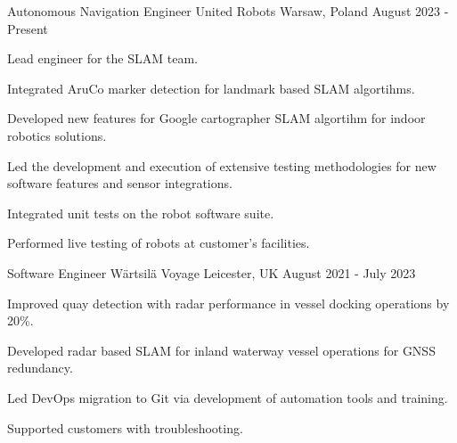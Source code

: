

\begin{cventries}

  \cventry
    {Autonomous Navigation Engineer} %
    {United Robots} %
    {Warsaw, Poland} %
    {August 2023 - Present} %
    {
      \begin{cvitems} %
        \item {Lead engineer for the SLAM team.}
        \item {Integrated AruCo marker detection for landmark based SLAM algortihms.}
        \item {Developed new features for Google cartographer SLAM algortihm for indoor robotics solutions.}
        \item {Led the development and execution of extensive testing methodologies for new software features and sensor integrations.}
        \item {Integrated unit tests on the robot software suite.}
        \item {Performed live testing of robots at customer's facilities.}
      \end{cvitems}
    }

  \cventry
    {Software Engineer} %
    {Wärtsilä Voyage} %
    {Leicester, UK} %
    {August 2021 - July 2023} %
    {
      \begin{cvitems} %
        \item {Improved quay detection with radar performance in vessel docking operations by 20\%.}
        \item {Developed radar based SLAM for inland waterway vessel operations for GNSS redundancy.}
        \item {Led DevOps migration to Git via development of automation tools and training.}
        \item {Supported customers with troubleshooting.}
      \end{cvitems}
    }


\end{cventries}
